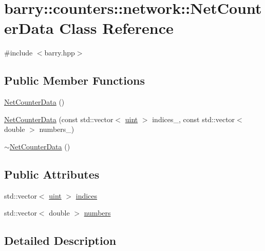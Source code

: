 \hypertarget{classbarry_1_1counters_1_1network_1_1_net_counter_data}{}\section{barry\+:\+:counters\+:\+:network\+:\+:Net\+Counter\+Data Class Reference}
\label{classbarry_1_1counters_1_1network_1_1_net_counter_data}


{\ttfamily \#include $<$barry.\+hpp$>$}

\subsection*{Public Member Functions}
\begin{DoxyCompactItemize}
\item 
\hyperlink{classbarry_1_1counters_1_1network_1_1_net_counter_data_a1fef852e8037b9334988e4df719d2e30}{Net\+Counter\+Data} ()
\item 
\hyperlink{classbarry_1_1counters_1_1network_1_1_net_counter_data_aec809349144f7b82fd0866ba89df1413}{Net\+Counter\+Data} (const std\+::vector$<$ \hyperlink{namespacebarry_a11dfc53ddb4672278319aa04f1e09a6c}{uint} $>$ indices\+\_\+, const std\+::vector$<$ double $>$ numbers\+\_\+)
\item 
\hyperlink{classbarry_1_1counters_1_1network_1_1_net_counter_data_ac2bfc760b63c81a8f6c316b338e95944}{$\sim$\+Net\+Counter\+Data} ()
\end{DoxyCompactItemize}
\subsection*{Public Attributes}
\begin{DoxyCompactItemize}
\item 
std\+::vector$<$ \hyperlink{namespacebarry_a11dfc53ddb4672278319aa04f1e09a6c}{uint} $>$ \hyperlink{classbarry_1_1counters_1_1network_1_1_net_counter_data_a2fb56e7f412a813c45cf1a3d5439a017}{indices}
\item 
std\+::vector$<$ double $>$ \hyperlink{classbarry_1_1counters_1_1network_1_1_net_counter_data_a720381c090feafdf9652f0ca19c5cc4b}{numbers}
\end{DoxyCompactItemize}


\subsection{Detailed Description}


